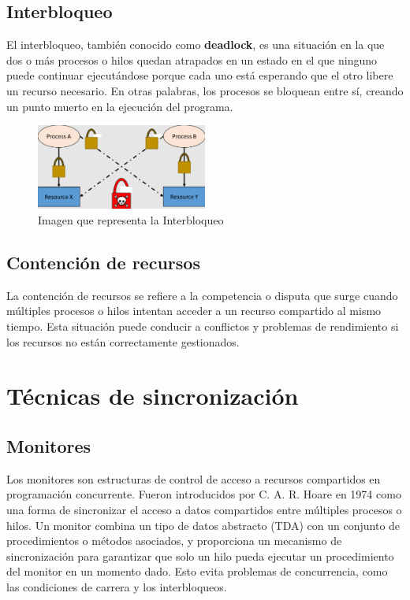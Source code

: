 \documentclass[12pt,a4paper]{article}
\begin{document}
\subsection{Interbloqueo}
El interbloqueo, también conocido como \textbf{deadlock}, es una situación en la que dos o más procesos o hilos quedan atrapados en un estado en el que ninguno puede continuar ejecutándose porque cada uno está esperando que el otro libere un recurso necesario. En otras palabras, los procesos se bloquean entre sí, creando un punto muerto en la ejecución del programa.
\begin{figure}[htb!]
    \centering
    \caption{Imagen que representa la Interbloqueo } 
    \includegraphics[width=0.5\textwidth]{images/Interbloqueo.png}
    
\end{figure}
\subsection{Contención de recursos}
La contención de recursos se refiere a la competencia o disputa que surge cuando múltiples procesos o hilos intentan acceder a un recurso compartido al mismo tiempo. Esta situación puede conducir a conflictos y problemas de rendimiento si los recursos no están correctamente gestionados.

\section{Técnicas de sincronización}
\subsection{Monitores}
Los monitores son estructuras de control de acceso a recursos compartidos en programación concurrente. Fueron introducidos por C. A. R. Hoare en 1974 como una forma de sincronizar el acceso a datos compartidos entre múltiples procesos o hilos.
\espacio
Un monitor combina un tipo de datos abstracto (TDA) con un conjunto de procedimientos o métodos asociados, y proporciona un mecanismo de sincronización para garantizar que solo un hilo pueda ejecutar un procedimiento del monitor en un momento dado. Esto evita problemas de concurrencia, como las condiciones de carrera y los interbloqueos.\\
\end{document}
